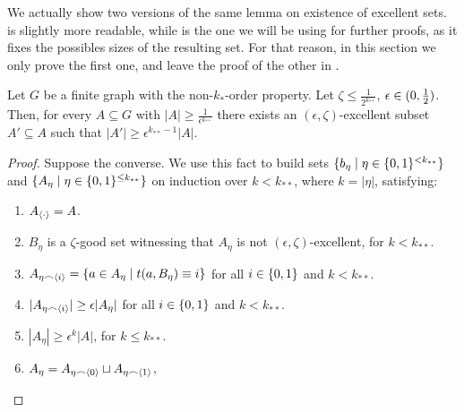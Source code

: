     We actually show two versions of the same lemma on existence of excellent sets.
     is slightly more readable, while
     is the one we will be using for further
    proofs, as it fixes the possibles sizes of the resulting set.
    For that reason, in this section we only prove the first one, and leave the proof of the other in
    .

    \begin{lemma}[Claim 5.4] \label{lem:existance_of_excellent_subsets}
        Let $G$ be a finite graph with the non-$k_{*}$-order property.
        Let $\zeta \leq \frac{1}{2^{k_{**}}}$, $\epsilon \in ( 0, \frac{1}{2} )$.
        Then, for every $A \subseteq G$ with $|A| \geq \frac{1}{\epsilon^{k_{**}}}$ there exists an $(\epsilon, \zeta)$-excellent
        subset $A' \subseteq A$ such that $|A'| \geq \epsilon^{k_{**}-1} |A|$.
        \begin{proof}
            Suppose the converse.
            We use this fact to build sets $\{ b_\eta \mid \eta \in \{ 0,1 \}^{<k_{**}} \}$ and
            $\{ A_\eta \mid \eta \in \{ 0,1 \}^{\leq k_{**}} \}$ on induction over $k<k_{**}$, where $k = |\eta|$,
            satisfying:
            \begin{enumerate}
                \item\label{itm:existance_of_excellent_subsets.1} $A_{\left< \cdot \right>} = A$.
                \item\label{itm:existance_of_excellent_subsets.2} $B_\eta$ is a $\zeta$-good set witnessing that $A_\eta$ is not
                    $(\epsilon, \zeta)$-excellent, for $k < k_{**}$.
                \item\label{itm:existance_of_excellent_subsets.3} $A_{\eta \frown \left< i \right>} = \{ a \in A_\eta \mid t(a, B_\eta) \equiv i \}$
                    for all $i \in \{ 0,1 \}$ and $k < k_{**}$.
                \item\label{itm:existance_of_excellent_subsets.4} $| A_{\eta \frown \left< i \right>} | \geq \epsilon |A_\eta|$
                    for all $i \in \{ 0,1 \}$ and $k < k_{**}$.
                \item\label{itm:existance_of_excellent_subsets.5} $|A_\eta| \geq \epsilon^k |A|$, for $k \leq k_{**}$.
                \item\label{itm:existance_of_excellent_subsets.6} $A_\eta = A_{\eta \frown \left< 0 \right>} \sqcup A_{\eta \frown \left< 1 \right>}$,

\end{enumerate}
\end{proof}
\end{lemma}
